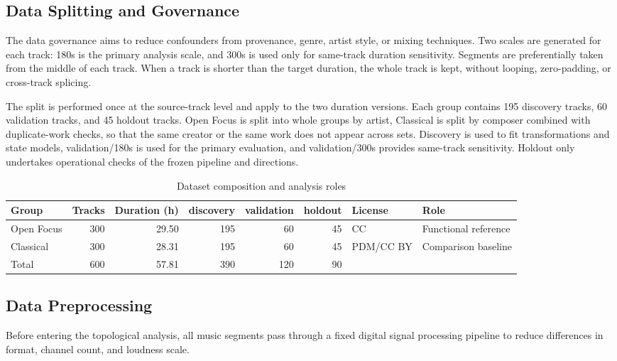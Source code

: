 \documentclass{article}
\begin{document}
\subsection{Data Splitting and Governance}

The data governance aims to reduce confounders from provenance, genre, artist style, or mixing techniques. Two scales are generated for each track: 180s is the primary analysis scale, and 300s is used only for same-track duration sensitivity. Segments are preferentially taken from the middle of each track. When a track is shorter than the target duration, the whole track is kept, without looping, zero-padding, or cross-track splicing.

The split is performed once at the source-track level and apply to the two duration versions. Each group contains 195 discovery tracks, 60 validation tracks, and 45 holdout tracks. Open Focus is split into whole groups by artist, Classical is split by composer combined with duplicate-work checks, so that the same creator or the same work does not appear across sets. Discovery is used to fit transformations and state models, validation/180s is used for the primary evaluation, and validation/300s provides same-track sensitivity. Holdout only undertakes operational checks of the frozen pipeline and directions.

\begin{table}[h]
\centering
\caption{Dataset composition and analysis roles}
\label{tab:dataset}
\renewcommand{\arraystretch}{1.5}
\begin{tabular}{lrrrrrll}
\toprule
Group & Tracks & Duration (h) & discovery & validation & holdout & License & Role \\
\midrule
Open Focus & 300 & 29.50 & 195 & 60 & 45 & CC & Functional reference \\
Classical  & 300 & 28.31 & 195 & 60 & 45 & PDM/CC BY & Comparison baseline \\
\midrule
Total      & 600 & 57.81 & 390 & 120 & 90 &  &  \\
\bottomrule
\end{tabular}
\end{table}

\subsection{Data Preprocessing}

Before entering the topological analysis, all music segments pass through a fixed digital signal processing pipeline to reduce differences in format, channel count, and loudness scale.
\end{document}

